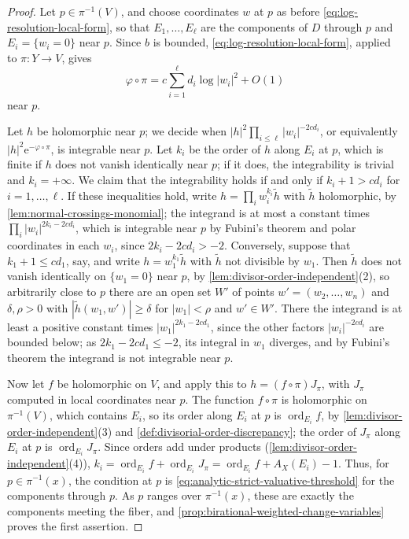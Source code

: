 \begin{proof}
Let $p\in\pi^{-1}(V)$, and choose coordinates $w$ at $p$ as before \eqref{eq:log-resolution-local-form}, so that $E_1,\ldots,E_\ell$ are the components of $D$ through $p$ and $E_i=\{w_i=0\}$ near $p$. Since $b$ is bounded, \eqref{eq:log-resolution-local-form}, applied to $\pi\colon Y\to V$, gives
\[
 \varphi\circ\pi=c\sum_{i=1}^{\ell}d_i\log|w_i|^2+O(1)
\]
near $p$.

Let $h$ be holomorphic near $p$; we decide when $|h|^2\prod_{i\leq\ell}|w_i|^{-2cd_i}$, or equivalently $|h|^2\mathrm e^{-\varphi\circ\pi}$, is integrable near $p$. Let $k_i$ be the order of $h$ along $E_i$ at $p$, which is finite if $h$ does not vanish identically near $p$; if it does, the integrability is trivial and $k_i=+\infty$. We claim that the integrability holds if and only if $k_i+1>cd_i$ for $i=1,\ldots,\ell$. If these inequalities hold, write $h=\prod_iw_i^{k_i}\tilde h$ with $\tilde h$ holomorphic, by \cref{lem:normal-crossings-monomial}; the integrand is at most a constant times $\prod_i|w_i|^{2k_i-2cd_i}$, which is integrable near $p$ by Fubini's theorem and polar coordinates in each $w_i$, since $2k_i-2cd_i>-2$. Conversely, suppose that $k_1+1\leq cd_1$, say, and write $h=w_1^{k_1}\tilde h$ with $\tilde h$ not divisible by $w_1$. Then $\tilde h$ does not vanish identically on $\{w_1=0\}$ near $p$, by \cref{lem:divisor-order-independent}(2), so arbitrarily close to $p$ there are an open set $W'$ of points $w'=(w_2,\ldots,w_n)$ and $\delta,\rho>0$ with $|\tilde h(w_1,w')|\geq\delta$ for $|w_1|<\rho$ and $w'\in W'$. There the integrand is at least a positive constant times $|w_1|^{2k_1-2cd_1}$, since the other factors $|w_i|^{-2cd_i}$ are bounded below; as $2k_1-2cd_1\leq-2$, its integral in $w_1$ diverges, and by Fubini's theorem the integrand is not integrable near $p$.

Now let $f$ be holomorphic on $V$, and apply this to $h=(f\circ\pi)J_\pi$, with $J_\pi$ computed in local coordinates near $p$. The function $f\circ\pi$ is holomorphic on $\pi^{-1}(V)$, which contains $E_i$, so its order along $E_i$ at $p$ is $\operatorname{ord}_{E_i}f$, by \cref{lem:divisor-order-independent}(3) and \cref{def:divisorial-order-discrepancy}; the order of $J_\pi$ along $E_i$ at $p$ is $\operatorname{ord}_{E_i}J_\pi$. Since orders add under products (\cref{lem:divisor-order-independent}(4)), $k_i=\operatorname{ord}_{E_i}f+\operatorname{ord}_{E_i}J_\pi=\operatorname{ord}_{E_i}f+A_X(E_i)-1$. Thus, for $p\in\pi^{-1}(x)$, the condition at $p$ is \eqref{eq:analytic-strict-valuative-threshold} for the components through $p$. As $p$ ranges over $\pi^{-1}(x)$, these are exactly the components meeting the fiber, and \cref{prop:birational-weighted-change-variables} proves the first assertion.


\end{proof}
